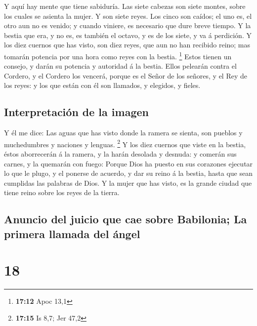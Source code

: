  Y aquí hay mente que tiene sabiduría. Las siete cabezas
son siete montes, sobre los cuales se asienta la mujer. 
Y son siete reyes. Los cinco son caídos; el uno es, el otro aun no es
venido; y cuando viniere, es necesario que dure breve tiempo.
 Y la bestia que era, y no es, es también el octavo, y es
de los siete, y va á perdición.  Y los diez cuernos que
has visto, son diez reyes, que aun no han recibido reino; mas tomarán
potencia por una hora como reyes con la bestia. \footnote{\textbf{17:12}
  Apoc 13,1}  Estos tienen un consejo, y darán su
potencia y autoridad á la bestia.  Ellos pelearán contra
el Cordero, y el Cordero los vencerá, porque es el Señor de los señores,
y el Rey de los reyes: y los que están con él son llamados, y elegidos,
y fieles.

\hypertarget{interpretaciuxf3n-de-la-imagen}{%
\subsection{Interpretación de la
imagen}\label{interpretaciuxf3n-de-la-imagen}}

 Y él me dice: Las aguas que has visto donde la ramera se
sienta, son pueblos y muchedumbres y naciones y lenguas. \footnote{\textbf{17:15}
  Is 8,7; Jer 47,2}  Y los diez cuernos que viste en la
bestia, éstos aborrecerán á la ramera, y la harán desolada y desnuda: y
comerán sus carnes, y la quemarán con fuego:  Porque Dios
ha puesto en sus corazones ejecutar lo que le plugo, y el ponerse de
acuerdo, y dar su reino á la bestia, hasta que sean cumplidas las
palabras de Dios.  Y la mujer que has visto, es la grande
ciudad que tiene reino sobre los reyes de la tierra.

\hypertarget{anuncio-del-juicio-que-cae-sobre-babilonia-la-primera-llamada-del-uxe1ngel}{%
\subsection{Anuncio del juicio que cae sobre Babilonia; La primera
llamada del
ángel}\label{anuncio-del-juicio-que-cae-sobre-babilonia-la-primera-llamada-del-uxe1ngel}}

\hypertarget{section-17}{%
\section{18}\label{section-17}}

